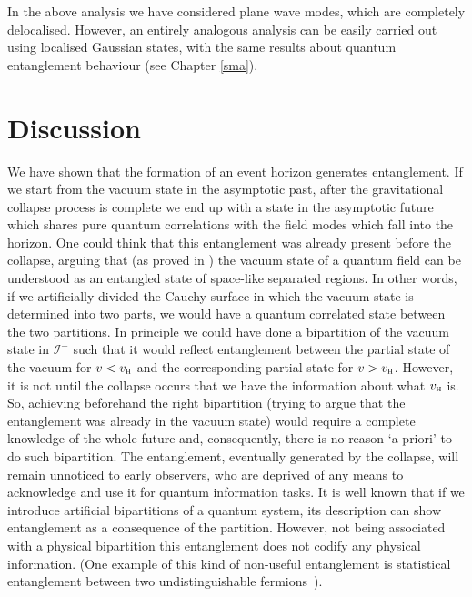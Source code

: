 In the above analysis we have considered plane wave modes, which are
completely delocalised. However, an entirely analogous analysis can be easily
carried out using localised Gaussian states, with the same
results about quantum entanglement behaviour (see Chapter \ref{sma}).


\section{Discussion}



We have shown that the formation of an event horizon generates
entanglement. If we start from the vacuum state in the asymptotic past,
after the gravitational collapse process is complete we end up with a
state in the asymptotic future which shares pure quantum correlations
with the field modes which fall into the horizon. One could think that this
entanglement was already present before the   collapse, arguing that (as
proved in \cite{Vacbell}) the vacuum state of a quantum field can be
understood as an entangled state of space-like separated regions. In
other words, if we artificially divided  the Cauchy surface in which the
vacuum state is determined into two parts, we would have a quantum
correlated state between the two partitions. In principle  we could have
done a bipartition of the vacuum state in $\mathscr{I}^-$ such that it
would reflect entanglement between the partial state of the vacuum for
$v<v_\textsc{h}$ and the corresponding partial state for
$v>v_\textsc{h}$. However, it is not until the collapse occurs that we
have the information about what $v_\textsc{h}$ is. So, achieving
beforehand the right bipartition (trying to argue that the entanglement
was already in the vacuum state) would require a complete knowledge of
the whole future and, consequently, there is no reason `a priori' to do
such bipartition. The entanglement, eventually generated by the collapse,
will remain unnoticed to early observers, who are deprived of any means
to acknowledge and use it for quantum information tasks. It is well known
that if we introduce artificial bipartitions of a quantum system, its
description can show entanglement as a consequence of the partition.
However, not being associated with a physical bipartition this
entanglement does not codify any physical information. (One example of
this kind of non-useful entanglement is statistical entanglement between
two undistinguishable fermions~\cite{sta1}).

